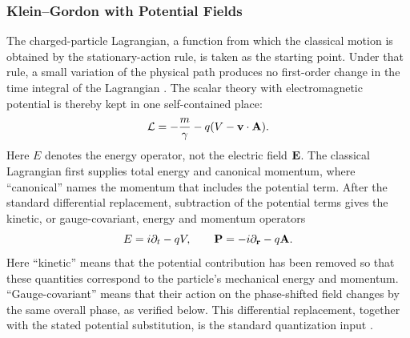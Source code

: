 \subsubsection{Klein--Gordon with Potential Fields}
The charged-particle Lagrangian, a function from which the classical motion
is obtained by the stationary-action rule, is taken as the starting point.
Under that rule, a small variation of the physical path produces no
first-order change in the time integral of the Lagrangian
\cite{jackson1998}. The scalar theory with electromagnetic potential is
thereby kept in one self-contained place:
\begin{equation*}
\mathcal L=-\frac{m}{\gamma}-q(V-\mathbf{v}\cdot\mathbf{A}).
\end{equation*}
Here \(E\) denotes the energy operator, not the electric field \(\mathbf{E}\).
The classical Lagrangian first supplies total energy and canonical momentum,
where ``canonical'' names the momentum that includes the potential term.
After the standard differential replacement, subtraction of the potential
terms gives the kinetic, or gauge-covariant, energy and momentum operators
\begin{equation*}
E=i\partial_t-qV,
\qquad
\mathbf{P}=-i\partial_{\mathbf{r}}-q\mathbf{A}.
\end{equation*}
Here ``kinetic'' means that the potential contribution has been removed so
that these quantities correspond to the particle's mechanical energy and
momentum. ``Gauge-covariant'' means that their action on the phase-shifted
field changes by the same overall phase, as verified below. This differential
replacement, together with the stated potential substitution, is the
standard quantization input \cite{greiner2000}.

